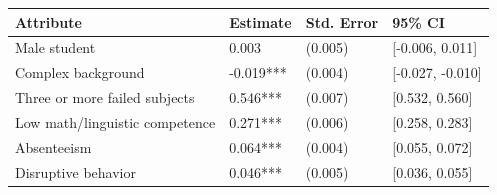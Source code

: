 \begin{tabular}{llll}
\toprule
Attribute & Estimate & Std. Error & 95\% CI\\
\midrule
Male student & 0.003 & (0.005) & {}[-0.006, 0.011]\\
Complex background & -0.019*** & (0.004) & {}[-0.027, -0.010]\\
Three or more failed subjects & 0.546*** & (0.007) & {}[0.532, 0.560]\\
Low math/linguistic competence & 0.271*** & (0.006) & {}[0.258, 0.283]\\
Absenteeism & 0.064*** & (0.004) & {}[0.055, 0.072]\\
\addlinespace
Disruptive behavior & 0.046*** & (0.005) & {}[0.036, 0.055]\\
\bottomrule
\end{tabular}
